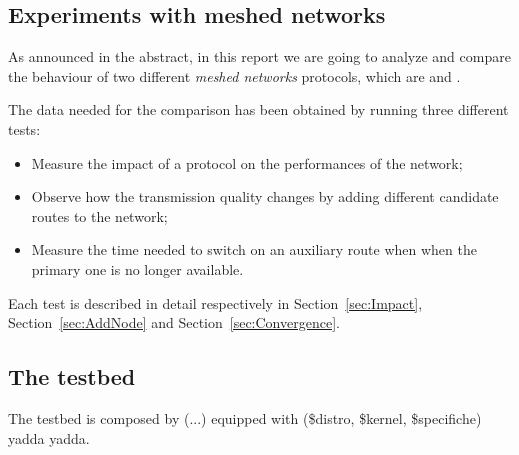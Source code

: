 \begin{multicols}{2}

    \subsection{Experiments with meshed networks}

        As announced in the abstract, in this report we are going to
        analyze and compare the behaviour of two different \emph{meshed
        networks} protocols, which are \batman\cite{bib:BATMAN} and
        \olsr\cite{bib:OLSR}.

        The data needed for the comparison has been obtained by running
        three different tests:
        \begin{itemize}
        \item   Measure the impact of a protocol on the performances of
                the network;
        \item   Observe how the transmission quality changes by adding
                different candidate routes to the network;
        \item   Measure the time needed to switch on an auxiliary route
                when when the primary one is no longer available.
        \end{itemize}

        Each test is described in detail respectively in
        Section~\ref{sec:Impact}, Section~\ref{sec:AddNode} and
        Section~\ref{sec:Convergence}.

    \subsection{The testbed}

        The testbed is composed by (...) equipped with (\$distro,
        \$kernel, \$specifiche) yadda yadda.

\end{multicols}
